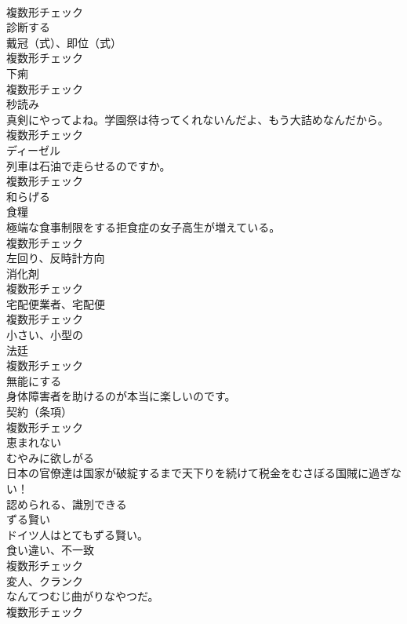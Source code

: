 \documentclass[8pt]{extreport}
\begin{document}
\begin{CJK}{UTF8}{min}
\\	複数形チェック
\\	[動詞]	診断する	
\\	[名詞]	戴冠（式）、即位（式）	
\\	複数形チェック
\\	[名詞]	下痢	
\\	複数形チェック
\\	[名詞]	秒読み	
\\	真剣にやってよね。学園祭は待ってくれないんだよ、もう大詰めなんだから。	
\\	複数形チェック
\\	[名詞]	ディーゼル	
\\	列車は石油で走らせるのですか。	
\\	複数形チェック
\\	[動詞]	和らげる	
\\	[名詞]	食糧	
\\	極端な食事制限をする拒食症の女子高生が増えている。	
\\	複数形チェック
\\	[形容詞]	左回り、反時計方向	
\\	[名詞]	消化剤	
\\	複数形チェック
\\	[名詞]	宅配便業者、宅配便	
\\	複数形チェック
\\	[形容詞]	小さい、小型の	
\\	[名詞]	法廷	
\\	複数形チェック
\\	[動詞]	無能にする	
\\	身体障害者を助けるのが本当に楽しいのです。	
\\	[名詞]	契約（条項）	
\\	複数形チェック
\\	[形容詞]	恵まれない	
\\	[動詞]	むやみに欲しがる	
\\	日本の官僚達は国家が破綻するまで天下りを続けて税金をむさぼる国賊に過ぎない！	
\\	[形容詞]	認められる、識別できる	
\\	[形容詞]	ずる賢い	
\\	ドイツ人はとてもずる賢い。	
\\	[名詞]	食い違い、不一致	
\\	複数形チェック
\\	[名詞]	変人、クランク	
\\	なんてつむじ曲がりなやつだ。	
\\	複数形チェック

\end{CJK}
\end{document}
